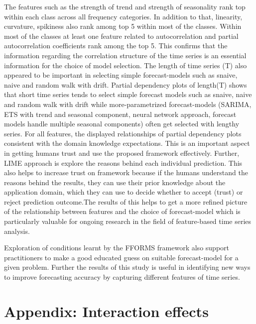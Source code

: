 \documentclass[11pt,a4paper,]{article}
\begin{document}
The features such as the strength of trend and strength of seasonality rank top within each class across all frequency categories. In addition to that, linearity, curvature, spikiness also rank among top 5 within most of the classes. Within most of the classes at least one feature related to autocorrelation and partial autocorrelation coefficients rank among the top 5. This confirms that the information regarding the correlation structure of the time series is an essential information for the choice of model selection. The length of time series (T) also appeared to be important in selecting simple forecast-models such as snaive, naive and random walk with drift. Partial dependency plots of length(T) shows that short time series tends to select simple forecast models such as snaive, naive and random walk with drift while more-parametrized forecast-models (SARIMA, ETS with trend and seasonal component, neural network approach, forecast models handle multiple seasonal components) often get selected with lengthy series. For all features, the displayed relationships of partial dependency plots consistent with the domain knowledge expectations. This is an important aspect in getting humans trust and use the proposed framework effectively. Further, LIME approach is explore the reasons behind each individual prediction. This also helps to increase trust on framework because if the humans understand the reasons behind the results, they can use their prior knowledge about the application domain, which they can use to decide whether to accept (trust) or reject prediction outcome.The results of this helps to get a more refined picture of the relationship between features and the choice of forecast-model which is particularly valuable for ongoing research in the field of feature-based time series analysis.

Exploration of conditions learnt by the FFORMS framework also support practitioners to make a good educated guess on suitable forecast-model for a given problem. Further the results of this study is useful in identifying new ways to improve forecasting accuracy by capturing different features of time series.

\hypertarget{appendix-interaction-effects}{%
\section*{Appendix: Interaction effects}\label{appendix-interaction-effects}}
\end{document}
